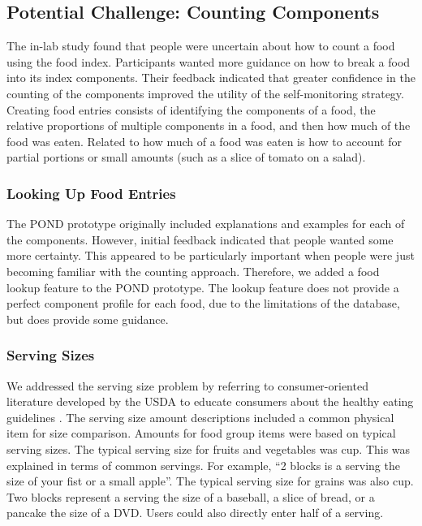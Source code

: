 \subsection{Potential Challenge: Counting Components}
The in-lab study found that people were uncertain about how to count a food using the food index. Participants wanted more guidance on how to break a food into its index components. Their feedback indicated that greater confidence in the counting of the components improved the utility of the self-monitoring strategy. Creating food entries consists of identifying the components of a food, the relative proportions of multiple components in a food, and then how much of the food was eaten. Related to how much of a food was eaten is how to account for partial portions or small amounts (such as a slice of tomato on a salad). 


\subsubsection{Looking Up Food Entries}
The POND prototype originally included explanations and examples for each of the components. However, initial feedback indicated that people wanted some more certainty. This appeared to be particularly important when people were just becoming familiar with the counting approach. Therefore, we added a food lookup feature to the POND prototype. The lookup feature does not provide a perfect component profile for each food, due to the limitations of the database, but does provide some guidance. 


\subsubsection{Serving Sizes}
We addressed the serving size problem by referring to consumer-oriented literature developed by the USDA to educate consumers about the healthy eating guidelines \citep{usda_dietary_guidelines_2010}. The serving size amount descriptions included a common physical item for size comparison. Amounts for  food group items were based on typical serving sizes. The typical serving size for fruits and vegetables was \textonehalf  cup. This was explained in terms of common servings. For example, ``2 blocks is a serving the size of your fist or a small apple''. The typical serving size for grains was also \textonehalf  cup. Two blocks represent a serving the size of a baseball, a slice of bread, or a pancake the size of a DVD. Users could also directly enter half of a serving. 


